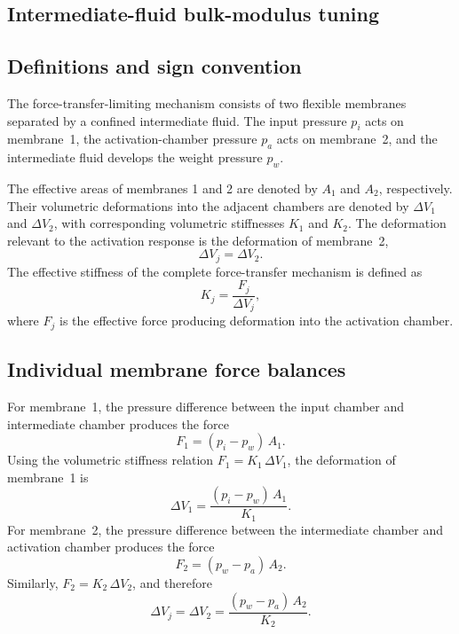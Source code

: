 \documentclass[11pt,a4paper]{article}
\numberwithin{equation}{section}
\begin{document}
\begin{appendices}
\renewcommand{\theequation}{\thesection.\arabic{equation}}

\section{Intermediate-fluid bulk-modulus tuning}
\label{app:bulk}

\subsection{Definitions and sign convention}

The force-transfer-limiting mechanism consists of two flexible membranes separated by a confined intermediate fluid.
The input pressure $p_i$ acts on membrane~1, the activation-chamber pressure $p_a$ acts on membrane~2, and the
intermediate fluid develops the weight pressure $p_w$.

The effective areas of membranes 1 and 2 are denoted by $A_1$ and $A_2$, respectively. Their volumetric
deformations into the adjacent chambers are denoted by $\Delta V_1$ and $\Delta V_2$, with corresponding volumetric
stiffnesses $K_1$ and $K_2$. The deformation relevant to the activation response is the deformation of membrane~2,
\begin{equation}
  \Delta V_j = \Delta V_2 .
\end{equation}
The effective stiffness of the complete force-transfer mechanism is defined as
\begin{equation}
  K_j = \frac{F_j}{\Delta V_j},
\end{equation}
where $F_j$ is the effective force producing deformation into the activation chamber.

\subsection{Individual membrane force balances}

For membrane~1, the pressure difference between the input chamber and intermediate chamber produces the force
\begin{equation}
  F_1 = (p_i - p_w)\,A_1 .
\end{equation}
Using the volumetric stiffness relation $F_1 = K_1\,\Delta V_1$, the deformation of membrane~1 is
\begin{equation}
  \Delta V_1 = \frac{(p_i - p_w)\,A_1}{K_1} .
\end{equation}
For membrane~2, the pressure difference between the intermediate chamber and activation chamber produces the force
\begin{equation}
  F_2 = (p_w - p_a)\,A_2 .
\end{equation}
Similarly, $F_2 = K_2\,\Delta V_2$, and therefore
\begin{equation}
  \Delta V_j = \Delta V_2 = \frac{(p_w - p_a)\,A_2}{K_2} .
\end{equation}


\end{appendices}
\end{document}
